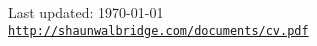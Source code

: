 \documentclass[letterpaper]{article}
\def\footerlink{http://shaunwalbridge.com/documents/cv.pdf}
\begin{document}
\vspace{3in}
\begin{center}
  \begin{footnotesize}
    Last updated: \today \\
    \href{\footerlink}{\texttt{\footerlink}}
  \end{footnotesize}
\end{center}
\end{document}
